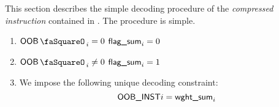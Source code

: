This section describes the simple decoding procedure of the \emph{compressed instruction} contained in \oobInstruction{}. The procedure is simple.
\begin{enumerate}
	\item \If $\oobStamp_{i} =    0$ \Then $\flagSum_{i} = 0$
	\item \If $\oobStamp_{i} \neq 0$ \Then $\flagSum_{i} = 1$
	\item We impose the following unique decoding constraint:
		\[
			\oobInstruction_{i} = \weightedFlagSum_{i}
		\]
\end{enumerate}
